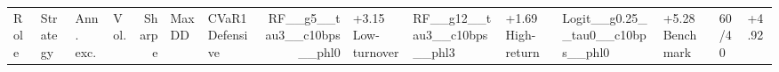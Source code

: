 \begin{tabular}{llllrllrl}
\toprule
Role & Strategy & Ann. exc. & Vol. & Sharpe & Max DD & CVaR1%
\midrule
Defensive & RF__g5__tau3__c10bps__phl0 & +3.15%
Low-turnover & RF__g12__tau3__c10bps__phl3 & +1.69%
High-return & Logit__g0.25__tau0__c10bps__phl0 & +5.28%
Benchmark & 60/40 & +4.92%
\bottomrule
\end{tabular}
